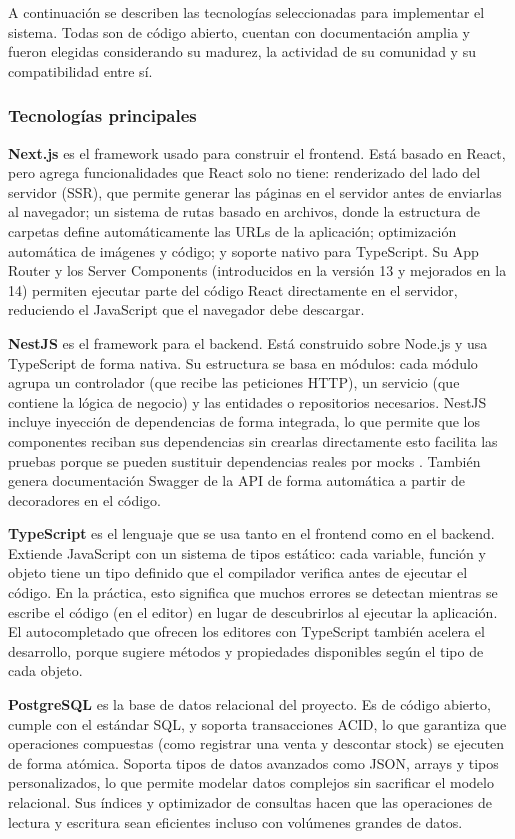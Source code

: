 \documentclass[spanish]{ieee_upb}
\begin{document}
A continuación se describen las tecnologías seleccionadas para implementar el sistema. Todas son de código abierto, cuentan con documentación amplia y fueron elegidas considerando su madurez, la actividad de su comunidad y su compatibilidad entre sí.

\subsubsection{Tecnologías principales}

\textbf{Next.js} es el framework usado para construir el frontend. Está basado en React, pero agrega funcionalidades que React solo no tiene: renderizado del lado del servidor (SSR), que permite generar las páginas en el servidor antes de enviarlas al navegador; un sistema de rutas basado en archivos, donde la estructura de carpetas define automáticamente las URLs de la aplicación; optimización automática de imágenes y código; y soporte nativo para TypeScript. Su App Router y los Server Components (introducidos en la versión 13 y mejorados en la 14) permiten ejecutar parte del código React directamente en el servidor, reduciendo el JavaScript que el navegador debe descargar.

\textbf{NestJS} es el framework para el backend. Está construido sobre Node.js y usa TypeScript de forma nativa. Su estructura se basa en módulos: cada módulo agrupa un controlador (que recibe las peticiones HTTP), un servicio (que contiene la lógica de negocio) y las entidades o repositorios necesarios. NestJS incluye inyección de dependencias de forma integrada, lo que permite que los componentes reciban sus dependencias sin crearlas directamente esto facilita las pruebas porque se pueden sustituir dependencias reales por mocks . También genera documentación Swagger de la API de forma automática a partir de decoradores en el código.

\textbf{TypeScript} es el lenguaje que se usa tanto en el frontend como en el backend. Extiende JavaScript con un sistema de tipos estático: cada variable, función y objeto tiene un tipo definido que el compilador verifica antes de ejecutar el código. En la práctica, esto significa que muchos errores se detectan mientras se escribe el código (en el editor) en lugar de descubrirlos al ejecutar la aplicación. El autocompletado que ofrecen los editores con TypeScript también acelera el desarrollo, porque sugiere métodos y propiedades disponibles según el tipo de cada objeto.

\textbf{PostgreSQL} es la base de datos relacional del proyecto. Es de código abierto, cumple con el estándar SQL, y soporta transacciones ACID, lo que garantiza que operaciones compuestas (como registrar una venta y descontar stock) se ejecuten de forma atómica. Soporta tipos de datos avanzados como JSON, arrays y tipos personalizados, lo que permite modelar datos complejos sin sacrificar el modelo relacional. Sus índices y optimizador de consultas hacen que las operaciones de lectura y escritura sean eficientes incluso con volúmenes grandes de datos.
\end{document}

